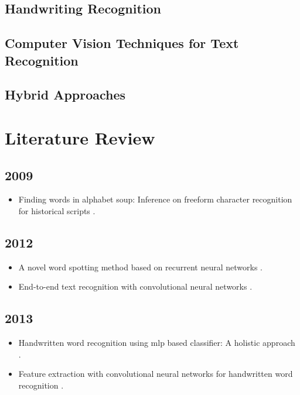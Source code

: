 \documentclass[final]{ukthesis}
\begin{document}
\subsection{Handwriting Recognition}

\subsection{Computer Vision Techniques for Text Recognition}

\subsection{Hybrid Approaches}



\section{Literature Review}
\subsection{2009}
\begin{itemize}
\item Finding words in alphabet soup: Inference on freeform character recognition for historical scripts \cite{howe2009finding}.
\end{itemize}

\subsection{2012}
\begin{itemize}
\item A novel word spotting method based on recurrent neural networks \cite{frinken2012novel}.
\item End-to-end text recognition with convolutional neural networks \cite{wang2012end}.
\end{itemize}

\subsection{2013}
\begin{itemize}
\item Handwritten word recognition using mlp based classifier: A holistic approach \cite{acharyya2013handwritten}.
\item Feature extraction with convolutional neural networks for handwritten word recognition \cite{bluche2013feature}.
\end{itemize}
\end{document}
